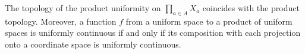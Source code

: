 The topology of the product uniformity on $\prod_{a \in A} X_a$ coincides with the product topology. Moreover, a function $f$ from a uniform space to a product of uniform spaces is uniformly continuous if and only if its composition with each projection onto a coordinate space is uniformly continuous.
